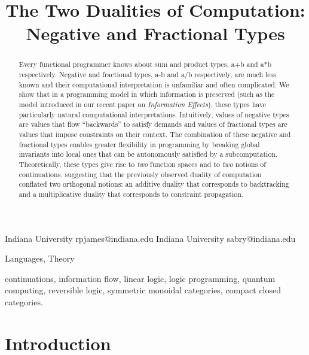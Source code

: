 \documentclass[preprint]{sigplanconf}
\begin{document}
\CopyrightYear{}
\copyrightdata{}
\titlebanner{}
\preprintfooter{}

\title{The Two Dualities of Computation: Negative and Fractional Types}
           {Indiana University}
           {rpjames@indiana.edu}
           {Indiana University}
           {sabry@indiana.edu}
\maketitle

\begin{abstract}
  Every functional programmer knows about sum and product types, {{a+b}} and
  {{a*b}} respectively. Negative and fractional types, {{a-b}} and {{a/b}}
  respectively, are much less known and their computational interpretation is
  unfamiliar and often complicated. We show that in a programming model in
  which information is preserved (such as the model introduced in our recent
  paper on \emph{Information Effects}), these types have particularly natural
  computational interpretations. Intuitively, values of negative types are
  values that flow ``backwards'' to satisfy demands and values of fractional
  types are values that impose constraints on their context.  The combination
  of these negative and fractional types enables greater flexibility in
  programming by breaking global invariants into local ones that can be
  autonomously satisfied by a subcomputation. Theoretically, these types give
  rise to \emph{two} function spaces and to \emph{two} notions of
  continuations, suggesting that the previously observed duality of
  computation conflated two orthogonal notions: an additive duality that
  corresponds to backtracking and a multiplicative duality that corresponds
  to constraint propagation.
\end{abstract}


\terms
Languages, Theory

\keywords continuations, information flow, linear logic, logic programming,
quantum computing, reversible logic, symmetric monoidal categories, compact
closed categories.

\section{Introduction}
\end{document}

